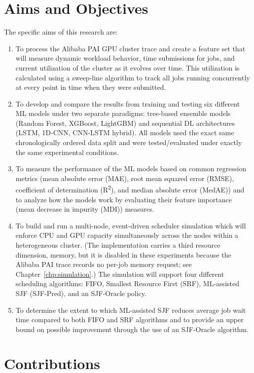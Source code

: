 \section{Aims and Objectives}

The specific aims of this research are:
\begin{enumerate}
    \item To process the Alibaba PAI GPU cluster trace and create a feature set that will measure dynamic workload behavior, time submissions for jobs, and current utilization of the cluster as it evolves over time. This utilization is calculated using a sweep-line algorithm to track all jobs running concurrently at every point in time when they were submitted.
    \item To develop and compare the results from training and testing six different ML models under two separate paradigms: tree-based ensemble models (Random Forest, XGBoost, LightGBM) and sequential DL architectures (LSTM, 1D-CNN, CNN-LSTM hybrid). All models used the exact same chronologically ordered data split and were tested/evaluated under exactly the same experimental conditions.
    \item To measure the performance of the ML models based on common regression metrics (mean absolute error (MAE), root mean squared error (RMSE), coefficient of determination (R\textsuperscript{2}), and median absolute error (MedAE)) and to analyze how the models work by evaluating their feature importance (mean decrease in impurity (MDI)) measures.
    \item To build and run a multi-node, event-driven scheduler simulation which will enforce CPU and GPU capacity simultaneously across the nodes within a heterogeneous cluster. (The implementation carries a third resource dimension, memory, but it is disabled in these experiments because the Alibaba PAI trace records no per-job memory request; see Chapter~\ref{chp:simulation}.) The simulation will support four different scheduling algorithms: FIFO, Smallest Resource First (SRF), ML-assisted SJF (SJF-Pred), and an SJF-Oracle policy.
    \item To determine the extent to which ML-assisted SJF reduces average job wait time compared to both FIFO and SRF algorithms and to provide an upper bound on possible improvement through the use of an SJF-Oracle algorithm.
\end{enumerate}

\section{Contributions}

